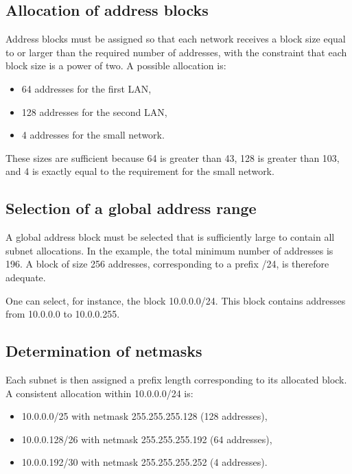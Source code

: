 \subsection{Allocation of address blocks}

Address blocks must be assigned so that each network receives a block size equal to or larger than the required number of addresses, with the constraint that each block size is a power of two. A possible allocation is:

\begin{itemize}
\item 64 addresses for the first LAN,
\item 128 addresses for the second LAN,
\item 4 addresses for the small network.
\end{itemize}

These sizes are sufficient because 64 is greater than 43, 128 is greater than 103, and 4 is exactly equal to the requirement for the small network.

\subsection{Selection of a global address range}

A global address block must be selected that is sufficiently large to contain all subnet allocations. In the example, the total minimum number of addresses is 196. A block of size 256 addresses, corresponding to a prefix /24, is therefore adequate.

One can select, for instance, the block 10.0.0.0/24. This block contains addresses from 10.0.0.0 to 10.0.0.255.

\subsection{Determination of netmasks}

Each subnet is then assigned a prefix length corresponding to its allocated block. A consistent allocation within 10.0.0.0/24 is:

\begin{itemize}
\item 10.0.0.0/25 with netmask 255.255.255.128 (128 addresses),
\item 10.0.0.128/26 with netmask 255.255.255.192 (64 addresses),
\item 10.0.0.192/30 with netmask 255.255.255.252 (4 addresses).
\end{itemize}

